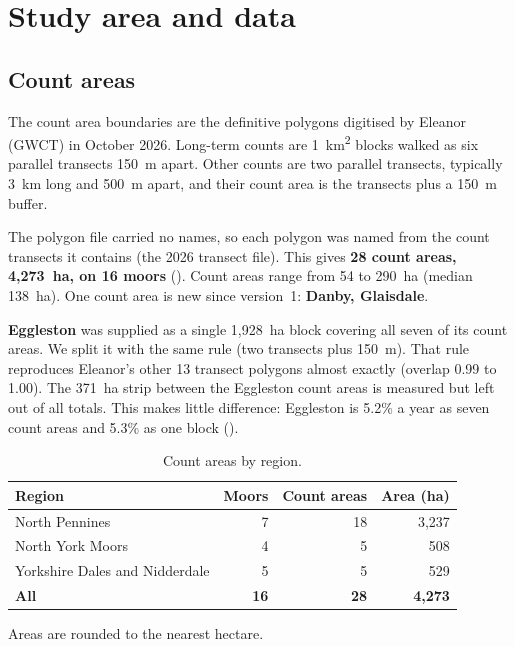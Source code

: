 \documentclass[11pt,a4paper]{article}
\begin{document}
\FloatBarrier
\section{Study area and data}\label{sec:data}

\subsection{Count areas}\label{sec:data-areas}

The count area boundaries are the definitive polygons digitised by Eleanor (GWCT) in October 2026. Long-term counts are 1~km\textsuperscript{2} blocks walked as six parallel transects 150~m apart. Other counts are two parallel transects, typically 3~km long and 500~m apart, and their count area is the transects plus a 150~m buffer.

The polygon file carried no names, so each polygon was named from the count transects it contains (the 2026 transect file). This gives \textbf{28 count areas, 4,273~ha, on 16 moors} (). Count areas range from 54 to 290~ha (median 138~ha). One count area is new since version~1: \textbf{Danby, Glaisdale}.

\textbf{Eggleston} was supplied as a single 1,928~ha block covering all seven of its count areas. We split it with the same rule (two transects plus 150~m). That rule reproduces Eleanor's other 13 transect polygons almost exactly (overlap 0.99 to 1.00). The 371~ha strip between the Eggleston count areas is measured but left out of all totals. This makes little difference: Eggleston is 5.2\% a year as seven count areas and 5.3\% as one block ().

\begin{table}[htbp]
\centering
\caption{Count areas by region.}\label{tab:areas}
\small
\begin{tabular}{lrrr}
\toprule
Region & Moors & Count areas & Area (ha) \\
\midrule
North Pennines & 7 & 18 & 3,237 \\
North York Moors & 4 & 5 & 508 \\
Yorkshire Dales and Nidderdale & 5 & 5 & 529 \\
\midrule
\textbf{All} & \textbf{16} & \textbf{28} & \textbf{4,273} \\
\bottomrule
\end{tabular}

{\footnotesize Areas are rounded to the nearest hectare.}
\end{table}
\end{document}
